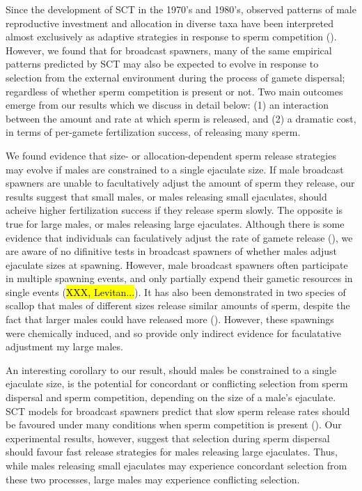 \documentclass{article}
\begin{document}
Since the development of SCT in the 1970's and 1980's, observed patterns of male reproductive investment and allocation in diverse taxa have been interpreted almost exclusively as adaptive strategies in response to sperm competition (\citealt{Parker1972,Parker1982,Wedell2002}). However, we found that for broadcast spawners, many of the same empirical patterns predicted by SCT may also be expected to evolve in response to selection from the external environment during the process of gamete dispersal; regardless of whether sperm competition is present or not. Two main outcomes emerge from our results which we discuss in detail below: (1) an interaction between the amount and rate at which sperm is released, and (2) a dramatic cost, in terms of per-gamete fertilization success, of releasing many sperm.

We found evidence that size- or allocation-dependent sperm release strategies may evolve if males are constrained to a single ejaculate size. If male broadcast spawners are unable to facultatively adjust the amount of sperm they release, our results suggest that small males, or males releasing small ejaculates, should acheive higher fertilization success if they release sperm slowly. The opposite is true for large males, or males releasing large ejaculates. Although there is some evidence that individuals can faculatively adjust the rate of gamete release (\citealt{Marshall2004}), we are aware of no difinitive tests in broadcast spawners of whether males adjust ejaculate sizes at spawning. However, male broadcast spawners often participate in multiple spawning events, and only partially expend their gametic resources in single events (\hl{XXX, Levitan...}). It has also been demonstrated in two species of scallop that males of different sizes release similar amounts of sperm, despite the fact that larger males could have released more (\citealt{Styan2003}). However, these spawnings were chemically induced, and so provide only indirect evidence for faculatative adjustment my large males. 

An interesting corollary to our result, should males be constrained to a single ejaculate size, is the potential for concordant or conflicting selection from sperm dispersal and sperm competition, depending on the size of a male's ejaculate. SCT models for broadcast spawners predict that slow sperm release rates should be favoured under many conditions when sperm competition is present (\citealt{Olito2015,Olito2017}). Our experimental results, however, suggest that selection during sperm dispersal should favour fast release strategies for males releasing large ejaculates. Thus, while males releasing small ejaculates may experience concordant selection from these two processes, large males may experience conflicting selection.
\end{document}
